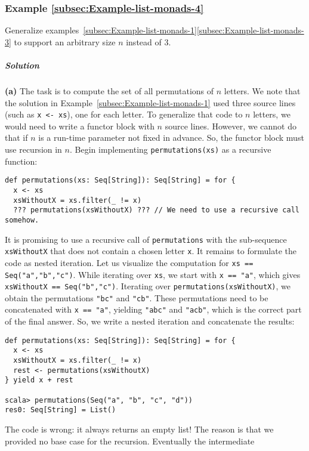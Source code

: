 \subsubsection{Example \label{subsec:Example-list-monads-4}\ref{subsec:Example-list-monads-4}}

Generalize examples~\ref{subsec:Example-list-monads-1}\textendash \ref{subsec:Example-list-monads-3}
to support an arbitrary size $n$ instead of $3$.

\subparagraph{Solution}

\textbf{(a)} The task is to compute the set of all permutations of
$n$ letters. We note that the solution in Example~\ref{subsec:Example-list-monads-1}
used three source lines (such as \lstinline!x <- xs!), one for each
letter. To generalize that code to $n$ letters, we would need to
write a functor block with $n$ source lines. However, we cannot do
that if $n$ is a run-time parameter not fixed in advance. So, the
functor block must use recursion in $n$. Begin implementing \lstinline!permutations(xs)!
as a recursive function:
\begin{lstlisting}
def permutations(xs: Seq[String]): Seq[String] = for {
  x <- xs
  xsWithoutX = xs.filter(_ != x)
  ??? permutations(xsWithoutX) ??? // We need to use a recursive call somehow.
\end{lstlisting}
It is promising to use a recursive call of \lstinline!permutations!
with the sub-sequence \lstinline!xsWithoutX! that does not contain
a chosen letter \lstinline!x!. It remains to formulate the code as
nested iteration. Let us visualize the computation for \lstinline!xs == Seq("a","b","c")!.
While iterating over \lstinline!xs!, we start with \lstinline!x == "a"!,
which gives \lstinline!xsWithoutX == Seq("b","c")!. Iterating over
\lstinline!permutations(xsWithoutX)!, we obtain the permutations
\lstinline!"bc"! and \lstinline!"cb"!. These permutations need to
be concatenated with \lstinline!x == "a"!, yielding \lstinline!"abc"!
and \lstinline!"acb"!, which is the correct part of the final answer.
So, we write a nested iteration and concatenate the results:
\begin{lstlisting}
def permutations(xs: Seq[String]): Seq[String] = for {
  x <- xs
  xsWithoutX = xs.filter(_ != x)
  rest <- permutations(xsWithoutX)
} yield x + rest

scala> permutations(Seq("a", "b", "c", "d"))
res0: Seq[String] = List()
\end{lstlisting}
The code is wrong: it always returns an empty list! The reason is
that we provided no base case for the recursion. Eventually the intermediate
